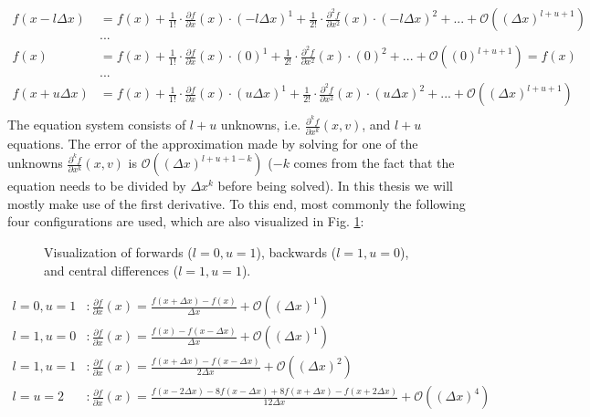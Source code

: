 \begin{align*}
f(x - l \Delta x) &= f(x) + \frac{1}{1!}\cdot\frac{\partial f}{\partial x}(x)\cdot (-l\Delta x)^1 + \frac{1}{2!}\cdot\frac{\partial^2 f}{\partial x^2}(x)\cdot (-l\Delta x)^2 + ... + \mathcal{O}((\Delta x) ^{l+u+1})\\
&...\\
f(x) &= f(x) + \frac{1}{1!}\cdot\frac{\partial f}{\partial x}(x)\cdot (0)^1 + \frac{1}{2!}\cdot\frac{\partial^2 f}{\partial x^2}(x)\cdot (0)^2 + ... + \mathcal{O}((0) ^{l+u+1})= f(x)\\
&...\\
f(x + u \Delta x) &= f(x) + \frac{1}{1!}\cdot\frac{\partial f}{\partial x}(x)\cdot (u\Delta x)^1 + \frac{1}{2!}\cdot\frac{\partial^2 f}{\partial x^2}(x)\cdot (u\Delta x)^2 + ... + \mathcal{O}((\Delta x) ^{l+u+1})\\
\end{align*}
The equation system consists of $l+u$ unknowns, i.e. $\frac{\partial^k f}{\partial x^k}(x,v)$, and $l+u$ equations.
The error of the approximation made by solving for one of the unknowns $\frac{\partial^k f}{\partial x^k}(x,v)$ is $\mathcal{O}((\Delta x) ^{l+u+1-k})$ ($-k$ comes from the fact that the equation needs to be divided by $\Delta x ^k$ before being solved).
In this thesis we will mostly make use of the first derivative.
To this end, most commonly the following four configurations are used, which are also visualized in Fig. \ref{fig:finite_differences}:

\begin{figure}[!h]
    \caption{Visualization of forwards ($l=0,u=1$), backwards ($l=1,u=0$), and central differences ($l=1,u=1$).}
    \label{fig:finite_differences}
\end{figure}

\begin{align*}
l=0,u=1&: \frac{\partial f}{\partial x}(x) = \frac{f(x+\Delta x) - f(x)}{\Delta x} + \mathcal{O}((\Delta x)^{1})\\
l=1,u=0&: \frac{\partial f}{\partial x}(x) = \frac{f(x) - f(x-\Delta x)}{\Delta x} + \mathcal{O}((\Delta x)^{1})\\
l=1,u=1&: \frac{\partial f}{\partial x}(x) = \frac{f(x + \Delta x) - f(x-\Delta x)}{2\Delta x} + \mathcal{O}((\Delta x)^{2})\\
l=u=2&: \frac{\partial f}{\partial x}(x) = \frac{f(x-2\Delta x) -8 f(x-\Delta x) + 8 f(x+\Delta x) - f(x+2\Delta x)}{12\Delta x} + \mathcal{O}((\Delta x)^{4})\\
\end{align*}

